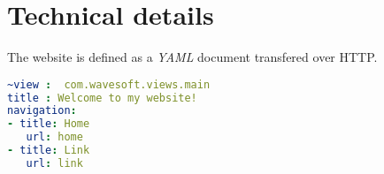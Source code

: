 \section{Technical details}
The website is defined as a \emph{YAML} document transfered over HTTP.

\begin{lstlisting}[language=YAML]
~view :  com.wavesoft.views.main
title : Welcome to my website!
navigation:
- title: Home
   url: home
- title: Link
   url: link

\end{lstlisting}
